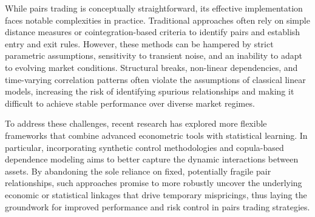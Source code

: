


While pairs trading is conceptually straightforward, its effective implementation faces notable complexities in practice. Traditional approaches often rely on simple distance measures or cointegration-based criteria to identify pairs and establish entry and exit rules. However, these methods can be hampered by strict parametric assumptions, sensitivity to transient noise, and an inability to adapt to evolving market conditions. Structural breaks, non-linear dependencies, and time-varying correlation patterns often violate the assumptions of classical linear models, increasing the risk of identifying spurious relationships and making it difficult to achieve stable performance over diverse market regimes.

To address these challenges, recent research has explored more flexible frameworks that combine advanced econometric tools with statistical learning. In particular, incorporating synthetic control methodologies and copula-based dependence modeling aims to better capture the dynamic interactions between assets. By abandoning the sole reliance on fixed, potentially fragile pair relationships, such approaches promise to more robustly uncover the underlying economic or statistical linkages that drive temporary mispricings, thus laying the groundwork for improved performance and risk control in pairs trading strategies.

